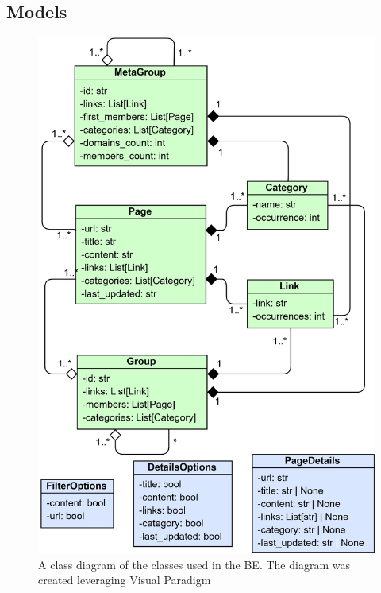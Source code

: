 \begin{appendices}
\subsection{Models} \label{dixModels}
\begin{figure}[ht!]
  \centering
  \includegraphics[height=0.85\textheight]{Images/BEmodelsDiagram.png}
  \caption{A class diagram of the classes used in the BE. The diagram was created leveraging Visual Paradigm \cite{visualParadigm}}
  \label{BEmodelsDiagram}
\end{figure}
\FloatBarrier 


\end{appendices}
